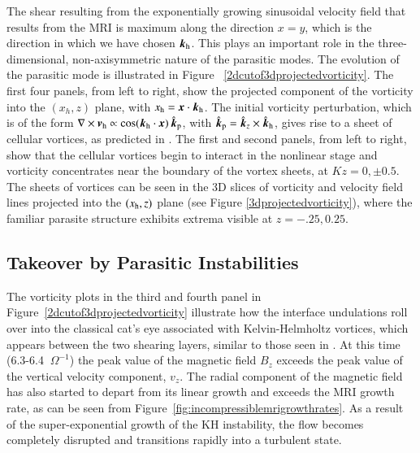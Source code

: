 \documentclass[]{emulateapj}
\newcommand\bb[1]{\mbox{\boldmath{$#1$}}}
\begin{document}
The shear resulting from the exponentially growing sinusoidal
velocity field that results from the MRI is maximum along the 
direction $x=y$, which is the direction in which we have chosen $\bb{k}_{\rm h}$.  
This plays an important role in the three-dimensional, non-axisymmetric 
nature of the parasitic modes.
The evolution of the parasitic mode is illustrated in Figure~
\ref{2dcutof3dprojectedvorticity}.  The first four panels, from left
to right, show the projected component of the vorticity into the
$(x_h,z)$ plane, with $x_{\rm h} = \bb{x} \cdot \bb{k}_{\rm h}$. 
The initial vorticity perturbation, which is of the form
$\nabla \times \bb{v}_{\rm h} \propto \cos ( \bb{k}_{\rm h} \cdot \bb{x})  \, \hat{\bb{k}}_{\rm p}$,
with  $\hat{\bb{k}}_{\rm p} = \hat{\bb{k}}_z \times \hat{\bb{k}}_{\rm h}$,
gives rise to a sheet of cellular vortices, as predicted in
\cite{Pessah:2010ic}.  The first and second panels, from left to right,
show that the cellular vortices begin to interact in the nonlinear
stage and vorticity concentrates near the boundary of the vortex
sheets, at $Kz=0,\pm 0.5$. 
The sheets of vortices can be seen in the 3D slices of vorticity and
velocity field lines projected into the $(x_{\rm h}, z)$ plane (see
Figure \ref{3dprojectedvorticity}), where the familiar parasite structure exhibits 
extrema visible at $z=-.25, 0.25$.



\subsection{Takeover by Parasitic Instabilities}

The vorticity plots in the third and fourth panel in Figure~\ref{2dcutof3dprojectedvorticity} 
illustrate how the interface undulations roll over into the classical cat's eye
associated with Kelvin-Helmholtz vortices, which appears between the
two shearing layers, similar to those seen in
\citet{Ryu:1996ha,Jones:1997it,Malagoli:1996um}.  At this time
(6.3-6.4 $~\Omega^{-1}$) the peak value of the magnetic field $B_z$ exceeds
the peak value of the vertical velocity component, $v_z$.  The radial
component of the magnetic field has also started to depart from its linear
growth and exceeds the MRI growth rate, as can be seen from Figure~\ref{fig:incompressiblemrigrowthrates}.
As a result of the super-exponential growth of the KH instability, the
flow becomes completely disrupted and transitions rapidly into a turbulent state.
\end{document}
